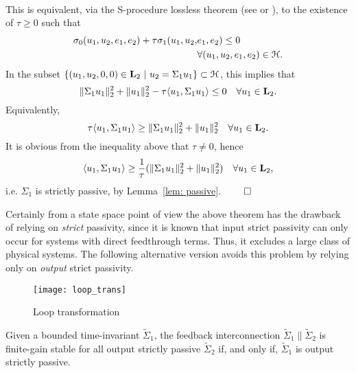 \documentclass{ifacconf}
\newcommand{\Ltwo}{\boldsymbol{\rm L}_{2}}
\theoremstyle{definition}
\begin{document}
\begin{pf}
\begin{align*}
\end{align*}
This is equivalent, via the S-procedure lossless theorem (see \cite{MegTre93} or \cite[Thm. 7]{Jon01}), to the existence of $\tau \geq 0$ such that
\begin{align*}
 \sigma_0(u_1, u_2, e_1, e_2) + \tau \sigma_1(u_1, u_2, & e_1, e_2) \leq 0 \\
 & \forall (u_1, u_2, e_1, e_2) \in \mathcal{H}.
\end{align*}
In the subset $\{(u_1, u_2, 0, 0) \in \Ltwo\ |\ u_2 = \Sigma_1 u_1\} \subset \HH$, this implies that
\[
\|\Sigma_1 u_1\|_2^2 + \|u_1\|_2^2 - \tau \langle u_1, \Sigma_1 u_1 \rangle \leq 0 \quad \forall u_1 \in \Ltwo.
\]
Equivalently,
\[
\tau \langle u_1, \Sigma_1 u_1 \rangle \geq \|\Sigma_1 u_1\|_2^2 + \|u_1\|_2^2 \quad \forall u_1 \in \Ltwo.
\]
It is obvious from the inequality above that $\tau \neq 0$, hence
\[
\langle u_1, \Sigma_1 u_1 \rangle \geq \frac{1}{\tau} (\|\Sigma_1 u_1\|_2^2 + \|u_1\|_2^2) \quad \forall u_1 \in \Ltwo,
\]
i.e. $\Sigma_1$ is strictly passive, by Lemma~\ref{lem: passive}. \hfill$\qed$
\end{pf}

Certainly from a state space point of view the above theorem has the drawback of relying on {\it strict} passivity, since it is known that input
strict passivity can only occur for systems with direct feedthrough terms. Thus, it excludes a large class of physical systems. The following
alternative version avoids this problem by relying only on {\it output} strict passivity.

\setlength{\unitlength}{0.7cm}
\begin{figure}[h]
  \centering \texttt{[image: loop\_trans]}
  \caption{Loop transformation} \label{fig: loop_trans}
\end{figure}

\begin{thm}
  Given a bounded time-invariant $\tilde{\Sigma}_1$, the feedback interconnection $\tilde{\Sigma}_1 \| \tilde{\Sigma}_2$ is finite-gain stable for all
  output strictly passive $\tilde{\Sigma}_2$ if, and only if, $\tilde{\Sigma}_1$ is output strictly passive.
\end{thm}
\end{document}
